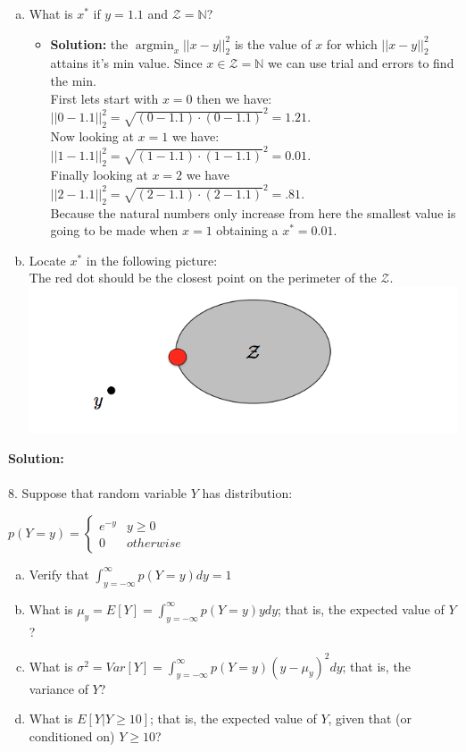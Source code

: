 \documentclass[a4paper]{article}
\DeclareMathOperator*{\argmin}{\arg\min}
\begin{document}
\begin{enumerate}[(a)]
\item What is $x^*$ if $y=1.1$ and $\mathcal{Z}=\mathbb{N}$?
  \begin{itemize}
    \item \textbf{Solution:} the $\argmin_x ||x-y||^2_2$ is the 
    value of $x$ for which $||x-y||^2_2$ attains it's min value.
    Since $x \in \mathcal{Z} = \mathbb{N}$ we can use trial and errors
    to find the min. \\ 
    First lets start with $x=0$ then we have:
    $||0-1.1||^2_2 = \sqrt{(0-1.1)\cdot (0-1.1)}^2=1.21$. \\ 
    Now looking at $x=1$ we have: $||1-1.1||^2_2 = \sqrt{(1-1.1)\cdot (1-1.1)}^2 =0.01$. \\
    Finally looking at $x=2$ we have $||2-1.1||^2_2 = \sqrt{(2-1.1)\cdot (2-1.1)}^2= .81$. \\
    Because the natural numbers only increase from here the smallest
    value is going to be made when $x=1$ obtaining a $x^*=0.01$. 
  \end{itemize}
\item Locate $x^*$ in the following picture:\\
The red dot should be the closest point on the 
perimeter of the $\mathcal{Z}$. \\
  \includegraphics[width=.5\textwidth]{pic_7_answer.png} \\

\end{enumerate}
\textbf{Solution:}
\\
\\
8. Suppose that random variable $Y$ has distribution:
\begin{center}
$p(Y=y)=\begin{cases}
e^{-y} & y\ge 0\\
0 & otherwise
\end{cases}$
\end{center}
\begin{enumerate}[(a)]
\item Verify that $\int_{y=-\infty}^{\infty} p(Y=y) dy=1 $
\item What is $\mu_y = E[Y]= \int_{y=-\infty}^{\infty} p(Y=y)ydy$; that is, the expected value of $Y$?
\item What is $\sigma^2=Var[Y]=\int_{y=-\infty}^{\infty} p(Y=y)(y-\mu_y)^2dy$; that is, the variance of $Y$?
\item What is $E[Y|Y\geq 10]$; that is, the expected value of $Y$, given that (or conditioned on) $Y \geq 10$?
\end{enumerate}
\end{document}
